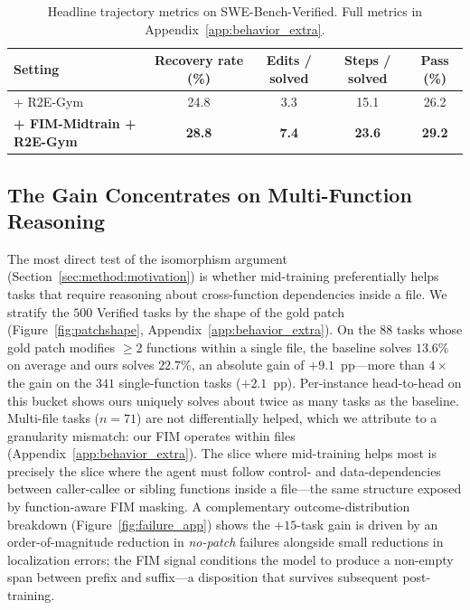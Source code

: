 \begin{table}[h]
\centering
\caption{Headline trajectory metrics on SWE-Bench-Verified. Full metrics in Appendix~\ref{app:behavior_extra}.}
\label{tab:behavior_main}
\small
\setlength{\tabcolsep}{8pt}
\vspace{-0.5ex}
\begin{tabular}{lcccc}
\toprule
Setting & Recovery rate (\%) & Edits / solved & Steps / solved & Pass (\%) \\
\midrule
+ R2E-Gym                          & 24.8           & 3.3           & 15.1           & 26.2 \\
\textbf{+ FIM-Midtrain + R2E-Gym}  & \textbf{28.8}  & \textbf{7.4}  & \textbf{23.6}  & \textbf{29.2} \\
\bottomrule
\end{tabular}
\vspace{-1ex}
\end{table}

\vspace{-0.5ex}
\subsection{The Gain Concentrates on Multi-Function Reasoning}
\label{sec:analysis:multifn}

The most direct test of the isomorphism argument
(Section~\ref{sec:method:motivation}) is whether mid-training
preferentially helps tasks that require reasoning about cross-function
dependencies inside a file. We stratify the $500$ Verified tasks by the
shape of the gold patch (Figure~\ref{fig:patchshape},
Appendix~\ref{app:behavior_extra}). On the $88$ tasks whose gold patch
modifies $\geq 2$ functions within a single file, the baseline solves
$13.6\%$ on average and ours solves $22.7\%$, an absolute gain of
$+9.1$~pp---more than $4{\times}$ the gain on the $341$ single-function
tasks ($+2.1$~pp). Per-instance head-to-head on this bucket shows ours
uniquely solves about twice as many tasks as the baseline. Multi-file
tasks ($n{=}71$) are not differentially helped, which we attribute to a
granularity mismatch: our FIM operates within files
(Appendix~\ref{app:behavior_extra}). The slice where mid-training helps
most is precisely the slice where the agent must follow control- and
data-dependencies between caller-callee or sibling functions inside a
file---the same structure exposed by function-aware FIM masking. A
complementary outcome-distribution breakdown
(Figure~\ref{fig:failure_app}) shows the $+15$-task gain is driven by an
order-of-magnitude reduction in \emph{no-patch} failures alongside small
reductions in localization errors; the FIM signal conditions the model
to produce a non-empty span between prefix and suffix---a disposition
that survives subsequent post-training.
